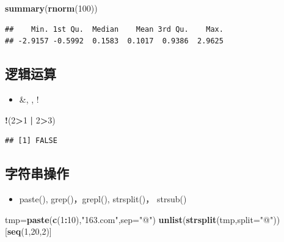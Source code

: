 \documentclass[]{book}
\newenvironment{Shaded}{\begin{snugshade}}{\end{snugshade}}
\newcommand{\DataTypeTok}[1]{\textcolor[rgb]{0.13,0.29,0.53}{#1}}
\newcommand{\DecValTok}[1]{\textcolor[rgb]{0.00,0.00,0.81}{#1}}
\newcommand{\KeywordTok}[1]{\textcolor[rgb]{0.13,0.29,0.53}{\textbf{#1}}}
\newcommand{\NormalTok}[1]{#1}
\newcommand{\OperatorTok}[1]{\textcolor[rgb]{0.81,0.36,0.00}{\textbf{#1}}}
\newcommand{\StringTok}[1]{\textcolor[rgb]{0.31,0.60,0.02}{#1}}
\providecommand{\tightlist}{%
  \setlength{\itemsep}{0pt}\setlength{\parskip}{0pt}}
\begin{document}
\begin{Shaded}
\begin{Highlighting}[]
\KeywordTok{summary}\NormalTok{(}\KeywordTok{rnorm}\NormalTok{(}\DecValTok{100}\NormalTok{))}
\end{Highlighting}
\end{Shaded}

\begin{verbatim}
##    Min. 1st Qu.  Median    Mean 3rd Qu.    Max. 
## -2.9157 -0.5992  0.1583  0.1017  0.9386  2.9625
\end{verbatim}

\hypertarget{section-11}{%
\subsection{逻辑运算}\label{section-11}}

\begin{itemize}
\tightlist
\item
  \&, \textbar{}, !
\end{itemize}

\begin{Shaded}
\begin{Highlighting}[]
\OperatorTok{!}\NormalTok{(}\DecValTok{2}\OperatorTok{>}\DecValTok{1} \OperatorTok{|}\StringTok{ }\DecValTok{2}\OperatorTok{>}\DecValTok{3}\NormalTok{)}
\end{Highlighting}
\end{Shaded}

\begin{verbatim}
## [1] FALSE
\end{verbatim}

\hypertarget{section-12}{%
\subsection{字符串操作}\label{section-12}}

\begin{itemize}
\tightlist
\item
  paste(), grep()，grepl(), strsplit()， strsub()
\end{itemize}

\begin{Shaded}
\begin{Highlighting}[]
\NormalTok{tmp=}\KeywordTok{paste}\NormalTok{(}\KeywordTok{c}\NormalTok{(}\DecValTok{1}\OperatorTok{:}\DecValTok{10}\NormalTok{),}\StringTok{"163.com"}\NormalTok{,}\DataTypeTok{sep=}\StringTok{"@"}\NormalTok{)}
\KeywordTok{unlist}\NormalTok{(}\KeywordTok{strsplit}\NormalTok{(tmp,}\DataTypeTok{split=}\StringTok{"@"}\NormalTok{))[}\KeywordTok{seq}\NormalTok{(}\DecValTok{1}\NormalTok{,}\DecValTok{20}\NormalTok{,}\DecValTok{2}\NormalTok{)]}
\end{Highlighting}
\end{Shaded}
\end{document}
